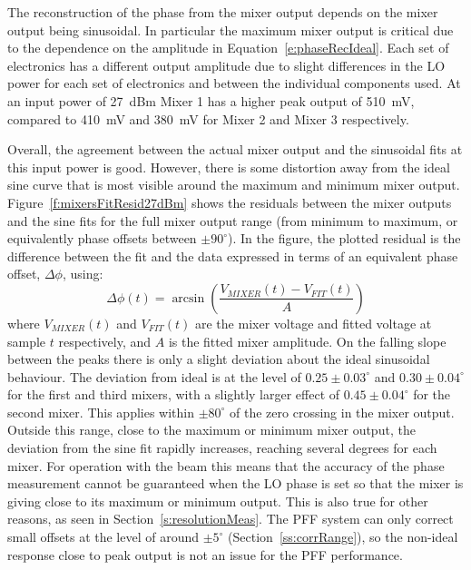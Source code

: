 The reconstruction of the phase from the mixer output depends on the mixer output being sinusoidal. In particular the maximum mixer output is critical due to the dependence on the amplitude in Equation~\ref{e:phaseRecIdeal}. Each set of electronics has a different output amplitude due to slight differences in the LO power for each set of electronics and between the individual components used. At an input power of 27~dBm Mixer 1 has a higher peak output of 510~mV, compared to 410~mV and 380~mV for Mixer 2 and Mixer 3 respectively. 

Overall, the agreement between the actual mixer output and the sinusoidal fits at this input power is good. However, there is some distortion away from the ideal sine curve that is most visible around the maximum and minimum mixer output. Figure~\ref{f:mixersFitResid27dBm} shows the residuals between the mixer outputs and the sine fits for the full mixer output range (from minimum to maximum, or equivalently phase offsets between \(\pm90^\circ\)). In the figure, the plotted residual is the difference between the fit and the data expressed in terms of an equivalent phase offset, \(\Delta \phi\), using:
\begin{equation}
\Delta \phi(t) = \arcsin\left(\frac{V_{MIXER}(t)-V_{FIT}(t)}{A}\right)
\end{equation}
where \(V_{MIXER}(t)\) and \(V_{FIT}(t)\) are the mixer voltage and fitted voltage at sample \(t\) respectively, and \(A\) is the fitted mixer amplitude. On the falling slope between the peaks there is only a slight deviation about the ideal sinusoidal behaviour. The deviation from ideal is at the level of \(0.25\pm0.03^\circ\) and \(0.30\pm0.04^\circ\) for the first and third mixers, with a slightly larger effect of \(0.45\pm0.04^\circ\) for the second mixer. This applies within \(\pm80^\circ\) of the zero crossing in the mixer output. Outside this range, close to the maximum or minimum mixer output, the deviation from the sine fit rapidly increases, reaching several degrees for each mixer. For operation with the beam this means that the accuracy of the phase measurement cannot be guaranteed when the LO phase is set so that the mixer is giving close to its maximum or minimum output. This is also true for other reasons, as seen in Section~\ref{s:resolutionMeas}. The PFF system can only correct small offsets at the level of around \(\pm5^\circ\) (Section~\ref{ss:corrRange}), so the non-ideal response close to peak output is not an issue for the PFF performance.

